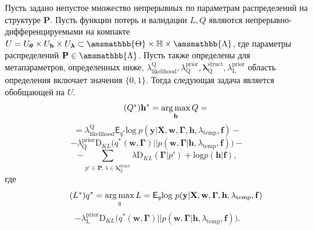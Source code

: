 \begin{theorem}
Пусть задано непустое множество непрерывных по параметрам распределений на структуре $\mathbf{P}$. 
Пусть функции потерь и валидации $L,Q$ являются непрерывно-дифференцируемыми на компакте  $U = U_{\boldsymbol{\theta}} \times U_{\mathbf{h}} \times U_{\boldsymbol{\lambda}} \subset \amsmathbb{\Theta} \times \mathbb{H} \times \amsmathbb{\Lambda}$, где параметры распределений $\mathbf{P} \in \amsmathbb{\Lambda}$. Пусть также определены для метапараметров, определенных ниже, $\lambda_\text{likelihood}^\text{Q}, \lambda^\text{prior}_\text{Q}, \boldsymbol{\lambda}^\text{struct}_\text{Q}, \lambda^\text{prior}_\text{L}$ область определения включает значения $\{0,1\}$.   
Тогда следующая задача является обобщающей на $U$.
\begin{equation}
\tag{$Q^{*}$}
\label{eq:qopt}
\mathbf{h}^{*} = \argmax_{\mathbf{h}} Q = 
\end{equation}
\[
= {\lambda_\text{likelihood}^\text{Q}\mathsf{E}_{{q}^{*}} \text{log}~{p(\mathbf{y} | \mathbf{X}, \mathbf{w},\boldsymbol{\Gamma}, \mathbf{h}, \lambda_\text{temp}, \mathbf{f})}}
 -\]
\vspace{-0.3cm}
\[- {\lambda^\text{prior}_\text{Q}\text{D}_{KL}\bigl( q^{*}(\mathbf{w}, \boldsymbol{\Gamma}) || p(\mathbf{w}, \boldsymbol{\Gamma} |\mathbf{h}, \lambda_{\text{temp}},\mathbf{f}) \bigr)}  -\]
\vspace{-0.3cm}
\[
 - {\sum_{p' \in \mathbf{P}, \lambda \in \boldsymbol{\lambda}^\text{struct}_\text{Q}} \lambda\text{D}_{KL}(\boldsymbol{\Gamma} | p') + \text{log}p(\mathbf{h}|\mathbf{f})}, 
\]
где 
\begin{equation}
\tag{$L^{*}$}
{q}^{*} = \argmax_{q} L = 
{\mathsf{E}_q \text{log}~{p(\mathbf{y} | \mathbf{X}, \mathbf{w}, \boldsymbol{\Gamma}, \mathbf{h}, \lambda_{\text{temp}}, \mathbf{f})}}
\end{equation}
\vspace{-0.3cm}
\[- {\lambda^\text{prior}_\text{L}\text{D}_{KL}\bigl( q^{*}(\mathbf{w}, \boldsymbol{\Gamma}) || p(\mathbf{w}, \boldsymbol{\Gamma} |\mathbf{h}, \lambda_{\text{temp}},\mathbf{f}) \bigr)}.
\]
\end{theorem}
